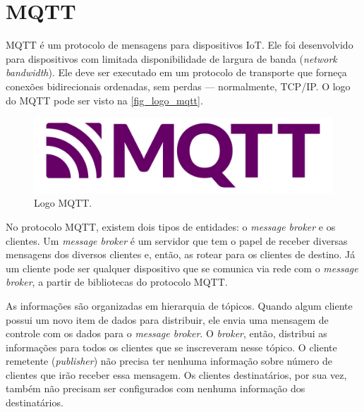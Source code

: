 \section{MQTT}\label{section_mqtt}
MQTT é um protocolo de mensagens para dispositivos IoT. Ele foi desenvolvido para dispositivos com limitada disponibilidade de largura de banda (\textit{network bandwidth}). Ele deve ser executado em um protocolo de transporte que forneça conexões bidirecionais ordenadas, sem perdas — normalmente, TCP/IP. O logo do MQTT pode ser visto na \autoref{fig_logo_mqtt}.
\begin{figure}[htb]\label{fig_logo_mqtt}
	\caption{Logo MQTT.}
	\begin{center}
		\includegraphics[scale=0.3]{Imagens/logo_mqtt.pdf}
	\end{center}
\end{figure}

No protocolo MQTT, existem dois tipos de entidades: o \textit{message broker} e os clientes. Um \textit{message broker} é um servidor que tem o papel de receber diversas mensagens dos diversos clientes e, então, as rotear para os clientes de destino. Já um cliente pode ser qualquer dispositivo que se comunica via rede com o \textit{message broker}, a partir de bibliotecas do protocolo MQTT.

As informações são organizadas em hierarquia de tópicos. Quando algum cliente possui um novo item de dados para distribuir, ele envia uma mensagem de controle com os dados para o \textit{message broker}. O \textit{broker}, então, distribui as informações para todos os clientes que se inscreveram nesse tópico. O cliente remetente (\textit{publisher}) não precisa ter nenhuma informação sobre número de clientes que irão receber essa mensagem. Os clientes destinatários, por sua vez, também não precisam ser configurados com nenhuma informação dos destinatários.

